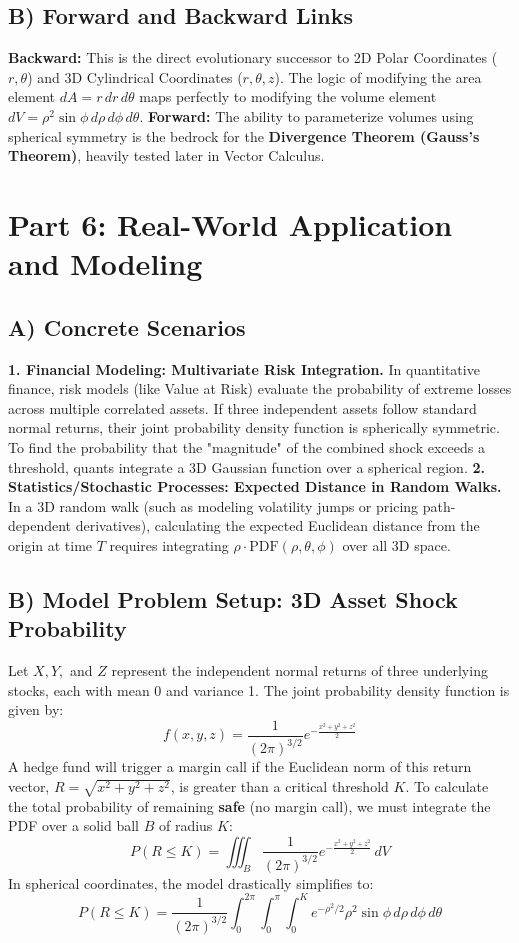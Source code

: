 \documentclass[12pt]{article}
\begin{document}
\subsection{B) Forward and Backward Links}
\textbf{Backward:} This is the direct evolutionary successor to 2D Polar Coordinates ($r, \theta$) and 3D Cylindrical Coordinates ($r, \theta, z$). The logic of modifying the area element $dA = r \, dr \, d\theta$ maps perfectly to modifying the volume element $dV = \rho^2 \sin\phi \, d\rho \, d\phi \, d\theta$.
\textbf{Forward:} The ability to parameterize volumes using spherical symmetry is the bedrock for the \textbf{Divergence Theorem (Gauss's Theorem)}, heavily tested later in Vector Calculus.

\newpage
\section{Part 6: Real-World Application and Modeling}

\subsection{A) Concrete Scenarios}
\textbf{1. Financial Modeling: Multivariate Risk Integration.} In quantitative finance, risk models (like Value at Risk) evaluate the probability of extreme losses across multiple correlated assets. If three independent assets follow standard normal returns, their joint probability density function is spherically symmetric. To find the probability that the "magnitude" of the combined shock exceeds a threshold, quants integrate a 3D Gaussian function over a spherical region.
\textbf{2. Statistics/Stochastic Processes: Expected Distance in Random Walks.} In a 3D random walk (such as modeling volatility jumps or pricing path-dependent derivatives), calculating the expected Euclidean distance from the origin at time $T$ requires integrating $\rho \cdot \text{PDF}(\rho, \theta, \phi)$ over all 3D space.

\subsection{B) Model Problem Setup: 3D Asset Shock Probability}
Let $X, Y,$ and $Z$ represent the independent normal returns of three underlying stocks, each with mean 0 and variance 1. The joint probability density function is given by:
\[ f(x,y,z) = \frac{1}{(2\pi)^{3/2}} e^{-\frac{x^2+y^2+z^2}{2}} \]
A hedge fund will trigger a margin call if the Euclidean norm of this return vector, $R = \sqrt{x^2+y^2+z^2}$, is greater than a critical threshold $K$. To calculate the total probability of remaining \textbf{safe} (no margin call), we must integrate the PDF over a solid ball $B$ of radius $K$:
\[ P(R \le K) = \iiint_B \frac{1}{(2\pi)^{3/2}} e^{-\frac{x^2+y^2+z^2}{2}} \, dV \]
In spherical coordinates, the model drastically simplifies to:
\[ P(R \le K) = \frac{1}{(2\pi)^{3/2}} \int_0^{2\pi} \int_0^\pi \int_0^K e^{-\rho^2/2} \rho^2 \sin\phi \, d\rho \, d\phi \, d\theta \]
\end{document}
